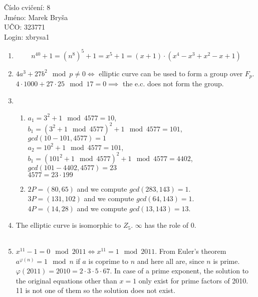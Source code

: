 \documentclass[a4paper,10pt]{extarticle}
\begin{document}
\begin{flushleft}
Číslo cvičení: 8 \\ 
Jméno: Marek Bryša \\
UČO: 323771\\
Login: xbrysa1\\
\end{flushleft}
\begin{enumerate}
  \item
    \[
    n^{40}+1=(n^8)^5+1=x^5+1=(x+1)\cdot(x^4-x^3+x^2-x+1)
    \]
  \item
    $4a^3+27b^2 \mod p \neq 0 \iff$ elliptic curve can be used to form a group over $F_p$.\\
    $4\cdot 1000+27\cdot25 \mod 17=0\implies$ the e.c. does not form the group.
  \item
    \begin{enumerate}
      \item
        $a_1=3^2+1 \mod 4577=10$, $b_1=(3^2+1 \mod 4577)^2 +1 \mod 4577=101$, $gcd(10-101,4577)=1$\\
        $a_2=10^2+1 \mod 4577=101$, $b_1=(101^2+1 \mod 4577)^2 +1 \mod 4577=4402$, $gcd(101-4402,4577)=23$\\
        $4577=23\cdot199$
      \item
        $2P=(80,65)$ and we compute $gcd(283,143)=1$.\\
        $3P=(131,102)$ and we compute $gcd(64,143)=1$.\\
        $4P=(14,28)$ and we compute $gcd(13,143)=13$.
    \end{enumerate}
  \item
    The elliptic curve is isomorphic to $Z_5$. $\infty$ has the role of 0.
    \begin{center}
      \begin{tabular}{|c|ccccc|}
        \hline
        
      \end{tabular}
    \end{center}
  \item
   $x^{11}-1=0 \mod 2011\iff x^{11}=1 \mod 2011$. From Euler's theorem $a^{\varphi(n)}=1 \mod n$ if $a$ is coprime to $n$
   and here all are, since $n$ is prime. $\varphi(2011)=2010=2\cdot3\cdot5\cdot67$. In case of a prime exponent, the solution to the original equations other than $x=1$ only exist for prime factors of 2010. 11 is not one of them so the solution does not exist.
\end{enumerate}
\end{document}
